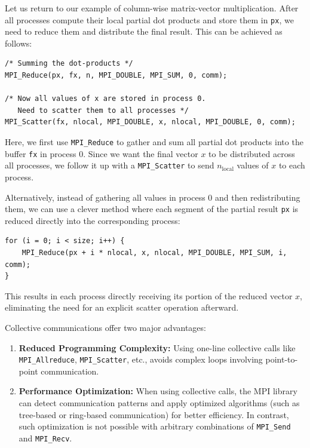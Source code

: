 \documentclass[12pt]{book}
\begin{document}
\vspace{1em}
Let us return to our example of column-wise matrix-vector multiplication. After all processes compute their local partial dot products and store them in \texttt{px}, we need to reduce them and distribute the final result. This can be achieved as follows:

\begin{lstlisting}[style=cppstyle]
/* Summing the dot-products */
MPI_Reduce(px, fx, n, MPI_DOUBLE, MPI_SUM, 0, comm);

/* Now all values of x are stored in process 0. 
   Need to scatter them to all processes */
MPI_Scatter(fx, nlocal, MPI_DOUBLE, x, nlocal, MPI_DOUBLE, 0, comm);
\end{lstlisting}

Here, we first use \texttt{MPI\_Reduce} to gather and sum all partial dot products into the buffer \texttt{fx} in process 0. Since we want the final vector $x$ to be distributed across all processes, we follow it up with a \texttt{MPI\_Scatter} to send $n_\text{local}$ values of $x$ to each process.

Alternatively, instead of gathering all values in process 0 and then redistributing them, we can use a clever method where each segment of the partial result \texttt{px} is reduced directly into the corresponding process:

\begin{lstlisting}[style=cppstyle]
for (i = 0; i < size; i++) {
    MPI_Reduce(px + i * nlocal, x, nlocal, MPI_DOUBLE, MPI_SUM, i, comm);
}
\end{lstlisting}

This results in each process directly receiving its portion of the reduced vector $x$, eliminating the need for an explicit scatter operation afterward.

\vspace{1em}
Collective communications offer two major advantages:
\begin{enumerate}
    \item \textbf{Reduced Programming Complexity:} Using one-line collective calls like \texttt{MPI\_Allreduce}, \texttt{MPI\_Scatter}, etc., avoids complex loops involving point-to-point communication.
    \item \textbf{Performance Optimization:} When using collective calls, the MPI library can detect communication patterns and apply optimized algorithms (such as tree-based or ring-based communication) for better efficiency. In contrast, such optimization is not possible with arbitrary combinations of \texttt{MPI\_Send} and \texttt{MPI\_Recv}.
\end{enumerate}
\end{document}
